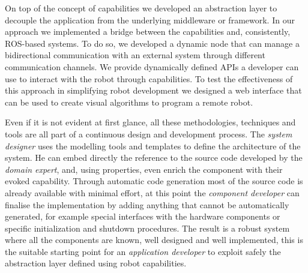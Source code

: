 On top of the concept of capabilities we developed an abstraction layer to decouple the application from the underlying middleware or framework. In our approach we implemented a bridge between the capabilities and, consistently, ROS-based systems. To do so, we developed a dynamic node that can manage a bidirectional communication with an external system through different communication channels. We provide dynamically defined APIs a developer can use to interact with the robot through capabilities. To test the effectiveness of this approach in simplifying robot development we designed a web interface that can be used to create visual algorithms to program a remote robot.

Even if it is not evident at first glance, all these methodologies, techniques and tools are all part of a continuous design and development process. The \textit{system designer} uses the modelling tools and templates to define the architecture of the system. He can embed directly the reference to the source code developed by the \textit{domain expert}, and, using properties, even enrich the component with their evoked capability. Through automatic code generation most of the source code is already available with minimal effort, at this point the \textit{component developer} can finalise the implementation by adding anything that cannot be automatically generated, for example special interfaces with the hardware components or specific initialization and shutdown procedures. The result is a robust system where all the components are known, well designed and well implemented, this is the suitable starting point for an \textit{application developer} to exploit safely the abstraction layer defined using robot capabilities.

